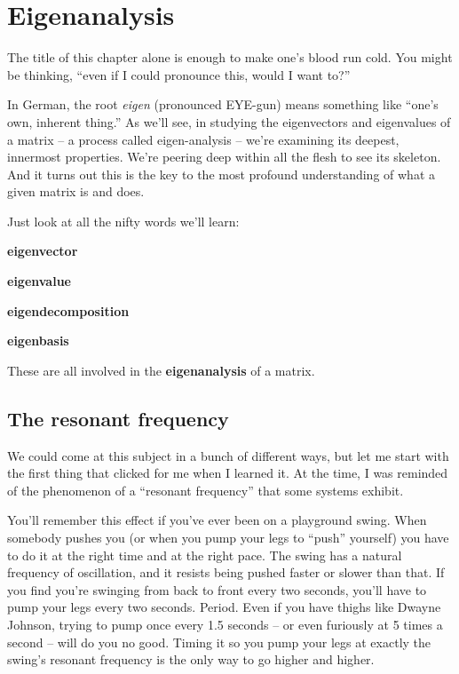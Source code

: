 


\chapter{Eigenanalysis}
\label{ch:eigen}

The title of this chapter alone is enough to make one's blood run cold. You
might be thinking, ``even if I could pronounce this, would I want to?''

In German, the root \textit{eigen} (pronounced EYE-gun) means something like
``one's own, inherent thing.'' As we'll see, in studying the eigenvectors and
eigenvalues of a matrix -- a process called eigen-analysis -- we're examining
its deepest, innermost properties. We're peering deep within all the flesh to
see its skeleton. And it turns out this is the key to the most profound
understanding of what a given matrix is and does.

Just look at all the nifty words we'll learn:

\begin{compactitem}
\item \textbf{eigenvector}
\item \textbf{eigenvalue}
\item \textbf{eigendecomposition}
\item \textbf{eigenbasis}
\end{compactitem}

These are all involved in the \textbf{eigenanalysis} of a matrix.

\section{The resonant frequency}


We could come at this subject in a bunch of different ways, but let me start
with the first thing that clicked for me when I learned it. At the time, I was
reminded of the phenomenon of a ``resonant frequency'' that some systems
exhibit.


You'll remember this effect if you've ever been on a playground swing. When
somebody pushes you (or when you pump your legs to ``push'' yourself) you have
to do it at the right time and at the right pace. The swing has a natural
frequency of oscillation, and it resists being pushed faster or slower than
that. If you find you're swinging from back to front every two seconds, you'll
have to pump your legs every two seconds. Period. Even if you have thighs like
Dwayne Johnson, trying to pump once every 1.5 seconds --  or even furiously at
5 times a second -- will do you no good. Timing it so you pump your legs at
exactly the swing's resonant frequency is the only way to go higher and higher.

